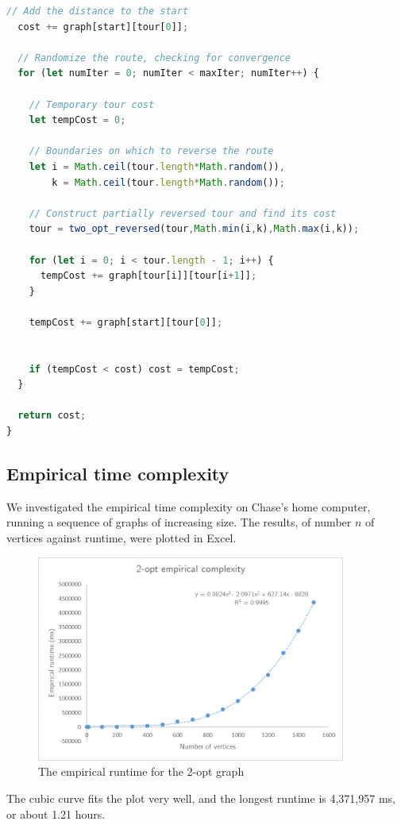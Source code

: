 \documentclass[10pt]{extarticle}
\begin{document}
\begin{lstlisting}[language=JavaScript]
  // Add the distance to the start
  cost += graph[start][tour[0]];
  
  // Randomize the route, checking for convergence
  for (let numIter = 0; numIter < maxIter; numIter++) {

    // Temporary tour cost
    let tempCost = 0;

    // Boundaries on which to reverse the route
    let i = Math.ceil(tour.length*Math.random()),
        k = Math.ceil(tour.length*Math.random());

    // Construct partially reversed tour and find its cost
    tour = two_opt_reversed(tour,Math.min(i,k),Math.max(i,k));

    for (let i = 0; i < tour.length - 1; i++) {
      tempCost += graph[tour[i]][tour[i+1]];
    }

    tempCost += graph[start][tour[0]];


    if (tempCost < cost) cost = tempCost;
  }

  return cost;
}
\end{lstlisting}


\subsection{Empirical time complexity}
We investigated the empirical time complexity on Chase's home computer,
running a sequence of graphs of increasing size. The results, of number
$n$ of vertices against runtime, were plotted in Excel.

\begin{figure}[ht]
    \centering
    \includegraphics[width=4in]{2Opt_trendline.png}
    \caption{The empirical runtime for the 2-opt graph}
    \label{fig:my_label}
\end{figure}

The cubic curve fits the plot very well, and the longest runtime is 4,371,957 ms,
or about 1.21 hours.
\end{document}
